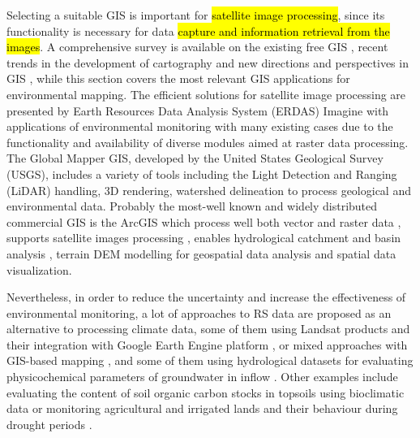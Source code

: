 \documentclass[land,article,submit,pdftex,moreauthors]{Definitions/mdpi}
\begin{document}
Selecting a suitable GIS is important for \hl{satellite image processing}, since its functionality is necessary for data \hl{capture and information retrieval from the images}. A comprehensive survey is available on the existing free GIS \cite{LEIDIG201549,CHEN2010253}, recent trends in the development of cartography \cite{WangWu} and new directions and perspectives in GIS \cite{Lietal2022}, while this section covers the most relevant GIS applications for environmental mapping. The efficient solutions for satellite image processing are presented by Earth Resources Data Analysis System (ERDAS) Imagine with applications of environmental monitoring \cite{FALAKI2020363} with many existing cases due to the functionality and availability of diverse modules aimed at raster data processing. The Global Mapper GIS, developed by the United States Geological Survey (USGS), includes a variety of tools including the Light Detection and Ranging (LiDAR) handling, 3D rendering, watershed delineation to process geological and environmental data. Probably the most-well known and widely distributed commercial GIS is the ArcGIS which process well both vector and raster data \cite{AlDjazouli}, supports satellite images processing \cite{SESNIE20082145}, enables hydrological catchment and basin analysis \cite{Nkiaka}, terrain DEM modelling for geospatial data analysis \cite{Kay} and spatial data visualization. 

Nevertheless, in order to reduce the uncertainty and increase the effectiveness of environmental monitoring, a lot of approaches to RS data are proposed as an alternative to processing climate data, some of them using Landsat products \cite{Lemenkova202315} and their integration with Google Earth Engine platform \cite{rs15133257}, or mixed approaches with GIS-based mapping \cite{SAIDI20091683,ANANE201236,Lemenkova202217}, and some of them using hydrological datasets for evaluating physicochemical parameters of groundwater in inflow \cite{BENBRAHIM2021104224}. Other examples include evaluating the content of soil organic carbon stocks in topsoils using bioclimatic data \cite{BAHRI2022e00561} or monitoring agricultural and irrigated lands and their behaviour during drought periods \cite{MOHAMED2023e01766}. 
\end{document}
